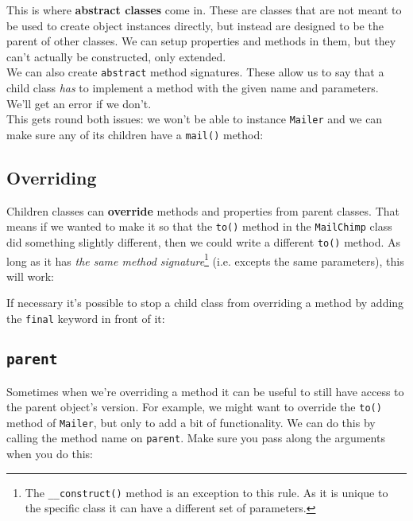 This is where \textbf{abstract classes} come in. These are classes that are not meant to be used to create object instances directly, but instead are designed to be the parent of other classes. We can setup properties and methods in them, but they can't actually be constructed, only extended.
\\

We can also create \texttt{abstract} method signatures. These allow us to say that a child class \textit{has} to implement a method with the given name and parameters. We'll get an error if we don't.
\\

This gets round both issues: we won't be able to instance \texttt{Mailer} and we can make sure any of its children have a \texttt{mail()} method:



\subsection{Overriding}

Children classes can \textbf{override} methods and properties from parent classes. That means if we wanted to make it so that the \texttt{to()} method in the \texttt{MailChimp} class did something slightly different, then we could write a different \texttt{to()} method. As long as it has \textit{the same method signature}\footnote{The \texttt{\_\_construct()} method is an exception to this rule. As it is unique to the specific class it can have a different set of parameters.} (i.e. excepts the same parameters), this will work:


If necessary it's possible to stop a child class from overriding a method by adding the \texttt{final} keyword in front of it:



\subsection{\texttt{parent}}

Sometimes when we're overriding a method it can be useful to still have access to the parent object's version. For example, we might want to override the \texttt{to()} method of \texttt{Mailer}, but only to add a bit of functionality. We can do this by calling the method name on \texttt{parent}. Make sure you pass along the arguments when you do this:

